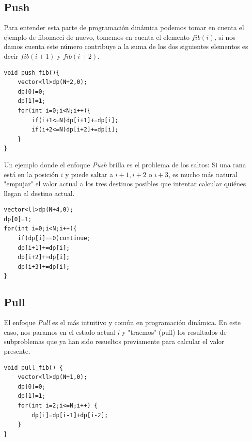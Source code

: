 \documentclass{article}
\begin{document}
\subsection*{Push}
Para entender esta parte de programación dinámica podemos tomar en cuenta el ejemplo de fibonacci de nuevo, tomemos en cuenta el elemento $fib(i)$, si nos damos cuenta este número contribuye a la suma de los dos siguientes elementos es decir $fib(i+1)$ y $fib(i+2)$.
\begin{lstlisting}
void push_fib(){
    vector<ll>dp(N+2,0); 
    dp[0]=0;
    dp[1]=1;
    for(int i=0;i<N;i++){
        if(i+1<=N)dp[i+1]+=dp[i];
        if(i+2<=N)dp[i+2]+=dp[i];
    }
}
\end{lstlisting}
Un ejemplo donde el enfoque \textit{Push} brilla es el problema de los saltos: Si una rana está en la posición $i$ y puede saltar a $i+1, i+2$ o $i+3$, es mucho más natural "empujar" el valor actual a los tres destinos posibles que intentar calcular quiénes llegan al destino actual.
\begin{lstlisting}
vector<ll>dp(N+4,0);
dp[0]=1;
for(int i=0;i<N;i++){
    if(dp[i]==0)continue;
    dp[i+1]+=dp[i];
    dp[i+2]+=dp[i];
    dp[i+3]+=dp[i];
}
\end{lstlisting}
\subsection*{Pull}
El enfoque \textit{Pull} es el más intuitivo y común en programación dinámica. En este caso, nos paramos en el estado actual $i$ y "traemos" (pull) los resultados de subproblemas que ya han sido resueltos previamente para calcular el valor presente.
\begin{lstlisting}
void pull_fib() {
    vector<ll>dp(N+1,0);
    dp[0]=0;
    dp[1]=1;
    for(int i=2;i<=N;i++) {
        dp[i]=dp[i-1]+dp[i-2];
    }
}
\end{lstlisting}
\end{document}
